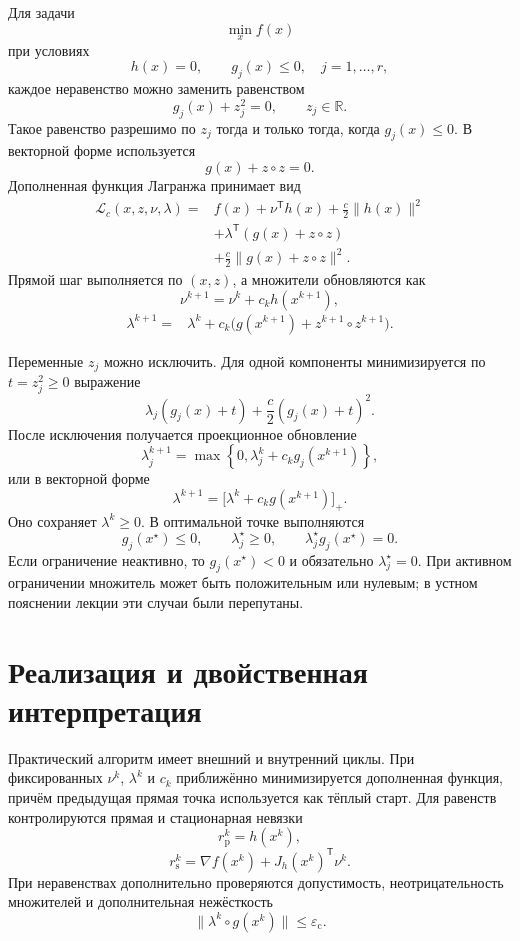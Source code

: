 Для задачи
\[
    \min_x f(x)
\]
при условиях
\[
    h(x)=0,
    \qquad
    g_j(x)\le0,
    \quad
    j=1,\ldots,r,
\]
каждое неравенство можно заменить равенством
\[
    g_j(x)+z_j^2=0,
    \qquad
    z_j\in\mathbb R.
\]
Такое равенство разрешимо по \(z_j\) тогда и только тогда, когда
\(g_j(x)\le0\). В векторной форме используется
\[
    g(x)+z\circ z=0.
\]
Дополненная функция Лагранжа принимает вид
\[
\begin{aligned}
    \mathcal L_c(x,z,\nu,\lambda)
    ={}&
    f(x)
    +
    \nu^{\mathsf T}h(x)
    +
    \frac c2\lVert h(x)\rVert^2
    \\
    &+
    \lambda^{\mathsf T}(g(x)+z\circ z)
    \\
    &+
    \frac c2
    \lVert g(x)+z\circ z\rVert^2.
\end{aligned}
\]
Прямой шаг выполняется по \((x,z)\), а множители обновляются как
\[
    \nu^{k+1}
    =
    \nu^k+c_kh(x^{k+1}),
\]
\[
\begin{aligned}
    \lambda^{k+1}
    ={}&
    \lambda^k
    +
    c_k
    \bigl(
        g(x^{k+1})
        +
        z^{k+1}\circ z^{k+1}
    \bigr).
\end{aligned}
\]

Переменные \(z_j\) можно исключить. Для одной компоненты минимизируется
по \(t=z_j^2\ge0\) выражение
\[
    \lambda_j(g_j(x)+t)
    +
    \frac c2(g_j(x)+t)^2.
\]
После исключения получается проекционное обновление
\[
    \lambda_j^{k+1}
    =
    \max\left\{
        0,
        \lambda_j^k+c_kg_j(x^{k+1})
    \right\},
\]
или в векторной форме
\[
    \lambda^{k+1}
    =
    \bigl[
        \lambda^k+c_kg(x^{k+1})
    \bigr]_+.
\]
Оно сохраняет \(\lambda^k\ge0\). В оптимальной точке выполняются
\[
    g_j(x^\star)\le0,
    \qquad
    \lambda_j^\star\ge0,
    \qquad
    \lambda_j^\star g_j(x^\star)=0.
\]
Если ограничение неактивно, то \(g_j(x^\star)<0\) и обязательно
\(\lambda_j^\star=0\). При активном ограничении множитель может быть
положительным или нулевым; в устном пояснении лекции эти случаи были
перепутаны.

\section{Реализация и двойственная интерпретация}

Практический алгоритм имеет внешний и внутренний циклы. При
фиксированных \(\nu^k\), \(\lambda^k\) и \(c_k\) приближённо
минимизируется дополненная функция, причём предыдущая прямая точка
используется как тёплый старт. Для равенств контролируются прямая и
стационарная невязки
\[
    r_{\mathrm p}^k=h(x^k),
\]
\[
    r_{\mathrm s}^k
    =
    \nabla f(x^k)
    +
    J_h(x^k)^{\mathsf T}\nu^k.
\]
При неравенствах дополнительно проверяются допустимость,
неотрицательность множителей и дополнительная нежёсткость
\[
    \lVert\lambda^k\circ g(x^k)\rVert
    \le
    \varepsilon_{\mathrm c}.
\]

